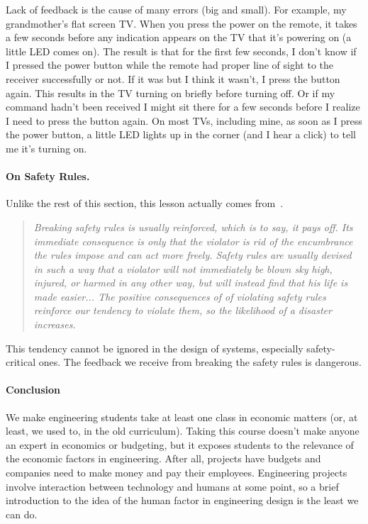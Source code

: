 Lack of feedback is the cause of many errors (big and small). For example, my grandmother's flat screen TV. When you press the power on the remote, it takes a few seconds before any indication appears on the TV that it's powering on (a little LED comes on). The result is that for the first few seconds, I don't know if I pressed the power button while the remote had proper line of sight to the receiver successfully or not. If it was but I think it wasn't, I press the button again. This results in the TV turning on briefly before turning off. Or if my command hadn't been received I might sit there for a few seconds before I realize I need to press the button again. On most TVs, including mine, as soon as I press the power button, a little LED lights up in the corner (and I hear a click) to tell me it's turning on.

\paragraph{On Safety Rules.}
Unlike the rest of this section, this lesson actually comes from~\cite{lofde, lof}.
\begin{quote}
\textit{Breaking safety rules is usually reinforced, which is to say, it pays off. Its immediate consequence is only that the violator is rid of the encumbrance the rules impose and can act more freely. Safety rules are usually devised in such a way that a violator will not immediately be blown sky high, injured, or harmed in any other way, but will instead find that his life is made easier... The positive consequences of of violating safety rules reinforce our tendency to violate them, so the likelihood of a disaster increases.}
\end{quote}

This tendency cannot be ignored in the design of systems, especially safety-critical ones. The feedback we receive from breaking the safety rules is dangerous.



\paragraph{Conclusion}
We make engineering students take at least one class in economic matters (or, at least, we used to, in the old curriculum). Taking this course doesn't make anyone an expert in economics or budgeting, but it exposes students to the relevance of the economic factors in engineering. After all, projects have budgets and companies need to make money and pay their employees. Engineering projects involve interaction between technology and humans at some point, so a brief introduction to the idea of the human factor in engineering design is the least we can do.





